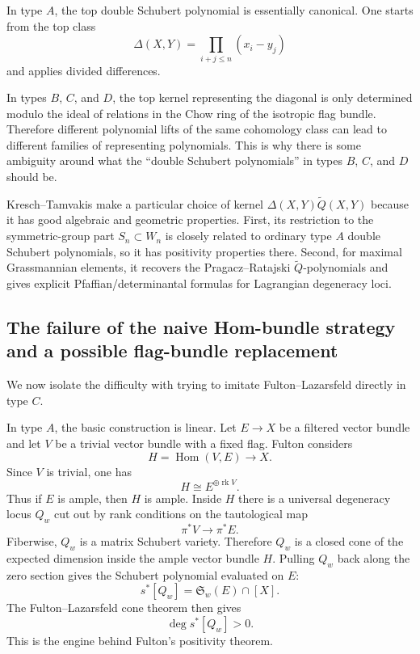 \documentclass[12pt]{article}
\begin{document}
In type $A$, the top double Schubert polynomial is essentially canonical. One starts from the top class
\[
    \Delta(X,Y)=\prod_{i+j\le n}(x_i-y_j)
\]
and applies divided differences.

In types $B$, $C$, and $D$, the top kernel representing the diagonal is only determined modulo the ideal of relations in the Chow ring of the isotropic flag bundle. Therefore different polynomial lifts of the same cohomology class can lead to different families of representing polynomials. This is why there is some ambiguity around what the ``double Schubert polynomials'' in types $B$, $C$, and $D$ should be.

Kresch--Tamvakis make a particular choice of kernel $\Delta(X,Y)\widetilde Q(X,Y)$
because it has good algebraic and geometric properties. First, its restriction to the symmetric-group part $S_n\subset W_n$ is closely related to ordinary type $A$ double Schubert polynomials, so it has positivity properties there. Second, for maximal Grassmannian elements, it recovers the Pragacz--Ratajski $\widetilde Q$-polynomials and gives explicit Pfaffian/determinantal formulas for Lagrangian degeneracy loci.



\subsection{The failure of the naive Hom-bundle strategy and a possible flag-bundle replacement}

We now isolate the difficulty with trying to imitate Fulton--Lazarsfeld directly in type $C$.

In type $A$, the basic construction is linear. Let $E\to X$ be a filtered vector bundle and let $V$ be a trivial vector bundle with a fixed flag. Fulton considers
\[
    H=\operatorname{Hom}(V,E)\longrightarrow X.
\]
Since $V$ is trivial, one has
\[
    H\cong E^{\oplus \operatorname{rk} V}.
\]
Thus if $E$ is ample, then $H$ is ample. Inside $H$ there is a universal degeneracy locus $Q_w$ cut out by rank conditions on the tautological map
\[
    \pi^*V\longrightarrow \pi^*E.
\]
Fiberwise, $Q_w$ is a matrix Schubert variety. Therefore $Q_w$ is a closed cone of the expected dimension inside the ample vector bundle $H$. Pulling $Q_w$ back along the zero section gives the Schubert polynomial evaluated on $E$:
\[
    s^*[Q_w]=\mathfrak S_w(E)\cap [X].
\]
The Fulton--Lazarsfeld cone theorem then gives
\[
    \deg s^*[Q_w]>0.
\]
This is the engine behind Fulton's positivity theorem.
\end{document}
